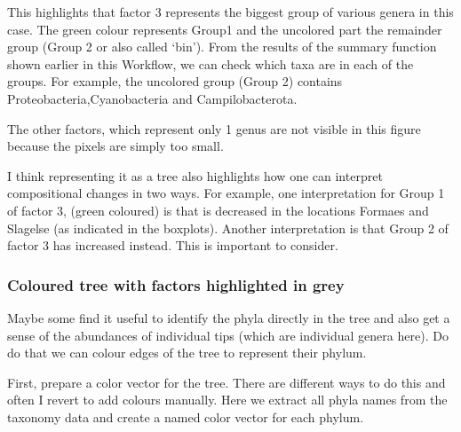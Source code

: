 \documentclass[
]{book}
\begin{document}
This highlights that factor 3 represents the biggest group of various genera in this case. The green colour represents Group1 and the uncolored part the remainder group (Group 2 or also called `bin'). From the results of the summary function shown earlier in this Workflow, we can check which taxa are in each of the groups. For example, the uncolored group (Group 2) contains Proteobacteria,Cyanobacteria and Campilobacterota.

The other factors, which represent only 1 genus are not visible in this figure because the pixels are simply too small.

I think representing it as a tree also highlights how one can interpret compositional changes in two ways. For example, one interpretation for Group 1 of factor 3, (green coloured) is that is decreased in the locations Formaes and Slagelse (as indicated in the boxplots). Another interpretation is that Group 2 of factor 3 has increased instead. This is important to consider.

\hypertarget{coloured-tree-with-factors-highlighted-in-grey}{%
\subsubsection{Coloured tree with factors highlighted in grey}\label{coloured-tree-with-factors-highlighted-in-grey}}

Maybe some find it useful to identify the phyla directly in the tree and also get a sense of the abundances of individual tips (which are individual genera here). Do do that we can colour edges of the tree to represent their phylum.

First, prepare a color vector for the tree. There are different ways to do this and often I revert to add colours manually. Here we extract all phyla names from the taxonomy data and create a named color vector for each phylum.
\end{document}
